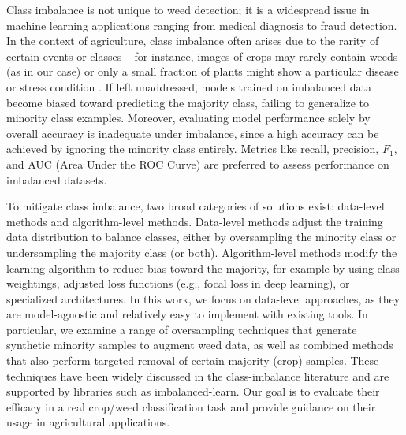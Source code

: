 \documentclass[agriengineering,article,submit,pdftex,moreauthors]{Definitions/mdpi}
\begin{document}
Class imbalance is not unique to weed detection; it is a widespread issue in machine learning applications ranging from medical diagnosis to fraud detection. In the context of agriculture, class imbalance often arises due to the rarity of certain events or classes – for instance, images of crops may rarely contain weeds (as in our case) or only a small fraction of plants might show a particular disease or stress condition \cite{Miftahushudur2025-dc}. If left unaddressed, models trained on imbalanced data become biased toward predicting the majority class, failing to generalize to minority class examples.  Moreover, evaluating model performance solely by overall accuracy is inadequate under imbalance, since a high accuracy can be achieved by ignoring the minority class entirely. Metrics like recall, precision, $F_{1}$, and AUC (Area Under the ROC Curve) are preferred to assess performance on imbalanced datasets.

To mitigate class imbalance, two broad categories of solutions exist: data-level methods and algorithm-level methods.  Data-level methods adjust the training data distribution to balance classes, either by oversampling the minority class or undersampling the majority class (or both). Algorithm-level methods modify the learning algorithm to reduce bias toward the majority, for example by using class weightings, adjusted loss functions (e.g., focal loss in deep learning), or specialized architectures. In this work, we focus on data-level approaches, as they are model-agnostic and relatively easy to implement with existing tools. In particular, we examine a range of oversampling techniques that generate synthetic minority samples to augment weed data, as well as combined methods that also perform targeted removal of certain majority (crop) samples. These techniques have been widely discussed in the class-imbalance literature and are supported by libraries such as imbalanced-learn. Our goal is to evaluate their efficacy in a real crop/weed classification task and provide guidance on their usage in agricultural applications.
\end{document}
